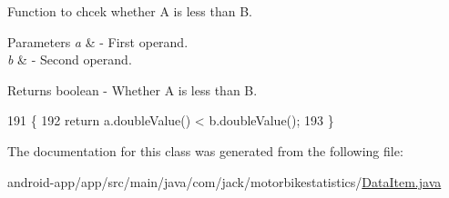 Function to chcek whether A is less than B. 


\begin{DoxyParams}{Parameters}
{\em a} & -\/ First operand. \\
\hline
{\em b} & -\/ Second operand. \\
\hline
\end{DoxyParams}
\begin{DoxyReturn}{Returns}
boolean -\/ Whether A is less than B. 
\end{DoxyReturn}

\begin{DoxyCode}
191                                                  \{
192         \textcolor{keywordflow}{return} a.doubleValue() < b.doubleValue();
193     \}
\end{DoxyCode}


The documentation for this class was generated from the following file\+:\begin{DoxyCompactItemize}
\item 
android-\/app/app/src/main/java/com/jack/motorbikestatistics/\hyperlink{_data_item_8java}{Data\+Item.\+java}\end{DoxyCompactItemize}

